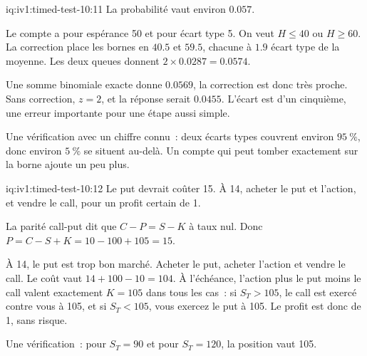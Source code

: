 \begin{solution}{iq:iv1:timed-test-10:11}
La probabilité vaut environ $0.057$.

Le compte a pour espérance 50 et pour écart type 5. On veut $H \le 40$ ou $H \ge 60$. La correction place les bornes en $40.5$ et $59.5$, chacune à $1.9$ écart type de la moyenne. Les deux queues donnent $2 \times 0.0287 = 0.0574$.

Une somme binomiale exacte donne $0.0569$, la correction est donc très proche. Sans correction, $z = 2$, et la réponse serait $0.0455$. L'écart est d'un cinquième, une erreur importante pour une étape aussi simple.

Une vérification avec un chiffre connu~: deux écarts types couvrent environ $95~\%$, donc environ $5~\%$ se situent au-delà. Un compte qui peut tomber exactement sur la borne ajoute un peu plus.

\end{solution}

\begin{solution}{iq:iv1:timed-test-10:12}
Le put devrait coûter 15. À 14, acheter le put et l'action, et vendre le call, pour un profit certain de 1.

La parité call-put dit que $C - P = S - K$ à taux nul. Donc $P = C - S + K = 10 - 100 + 105 = 15$.

À 14, le put est trop bon marché. Acheter le put, acheter l'action et vendre le call. Le coût vaut $14 + 100 - 10 = 104$. À l'échéance, l'action plus le put moins le call valent exactement $K = 105$ dans tous les cas~: si $S_T > 105$, le call est exercé contre vous à 105, et si $S_T < 105$, vous exercez le put à 105. Le profit est donc de 1, sans risque.

Une vérification~: pour $S_T = 90$ et pour $S_T = 120$, la position vaut 105.

\end{solution}

